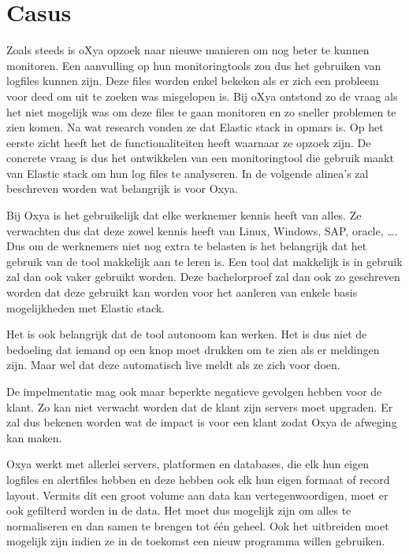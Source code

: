 
\chapter{Casus}
\label{ch:casus}
Zoals steeds is oXya opzoek naar nieuwe manieren om nog beter te kunnen monitoren. Een aanvulling op hun monitoringtools zou dus het gebruiken van logfiles kunnen zijn. Deze files worden enkel bekeken als er zich een probleem voor deed om uit te zoeken was misgelopen is.
Bij oXya ontstond zo de vraag als het niet mogelijk was om deze files te gaan monitoren en zo sneller problemen te zien komen.
Na wat research vonden ze dat Elastic stack in opmars is. Op het eerste zicht heeft het de functionaliteiten heeft waarnaar ze opzoek zijn. De concrete vraag is dus het ontwikkelen van een monitoringtool die gebruik maakt van Elastic stack om hun log files te analyseren.
In de volgende alinea's zal beschreven worden wat belangrijk is voor Oxya.

Bij Oxya is het gebruikelijk dat elke werknemer kennis heeft van alles. Ze verwachten dus dat deze zowel kennis heeft van Linux, Windows, SAP, oracle, \dots. Dus om de werknemers niet nog extra te belasten is het belangrijk dat het gebruik van de tool makkelijk aan te leren is. 
Een tool dat makkelijk is in gebruik zal dan ook vaker gebruikt worden. Deze bachelorproef zal dan ook zo geschreven worden dat deze gebruikt kan worden voor het aanleren van enkele basis mogelijkheden met Elastic stack.

Het is ook belangrijk dat de tool autonoom kan werken. Het is dus niet de bedoeling dat iemand op een knop moet drukken om te zien als er meldingen zijn. Maar wel dat deze automatisch live meldt als ze zich voor doen. 

De impelmentatie mag ook maar beperkte negatieve gevolgen hebben voor de klant. Zo kan niet verwacht worden dat de klant zijn servers moet upgraden. Er zal dus bekenen worden wat de impact is voor een klant zodat Oxya de afweging kan maken.

Oxya werkt met allerlei servers, platformen en databases, die elk hun eigen logfiles en alertfiles hebben en deze hebben ook elk hun eigen formaat of record layout. Vermits dit een groot volume aan data kan vertegenwoordigen, moet er ook gefilterd worden in de data. Het moet dus mogelijk zijn om alles te normaliseren en dan samen te brengen tot één geheel. Ook het uitbreiden moet mogelijk zijn indien ze in de toekomst een nieuw programma willen gebruiken.

